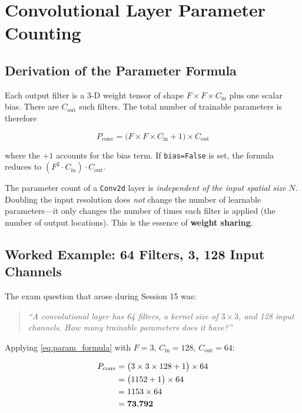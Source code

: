 \documentclass[12pt,a4paper]{article}
\newcommand{\Cin}{C_{\mathrm{in}}}
\newcommand{\Cout}{C_{\mathrm{out}}}
\begin{document}
\section{Convolutional Layer Parameter Counting}
\label{sec:param_count}

\subsection{Derivation of the Parameter Formula}

Each output filter is a 3-D weight tensor of shape $F \times F \times \Cin$
plus one scalar bias. There are $\Cout$ such filters. The total number of
trainable parameters is therefore

\begin{equation}
  \label{eq:param_formula}
  \boxed{P_{\mathrm{conv}} = \bigl(F \times F \times \Cin + 1\bigr) \times \Cout}
\end{equation}

\noindent
where the $+1$ accounts for the bias term. If \texttt{bias=False} is set,
the formula reduces to $(F^2 \cdot \Cin) \cdot \Cout$.

\begin{keyinsight}
The parameter count of a \texttt{Conv2d} layer is \emph{independent of the
input spatial size} $N$. Doubling the input resolution does \emph{not} change
the number of learnable parameters---it only changes the number of times each
filter is applied (the number of output locations). This is the essence of
\textbf{weight sharing}.
\end{keyinsight}

\subsection{Worked Example: 64 Filters, 3, 128 Input Channels}

The exam question that arose during Session 15 was:

\begin{quote}
\itshape
``A convolutional layer has 64 filters, a kernel size of $3 \times 3$, and
128 input channels. How many trainable parameters does it have?''
\end{quote}

Applying \cref{eq:param_formula} with $F = 3$, $\Cin = 128$, $\Cout = 64$:

\begin{align}
  P_{\mathrm{conv}}
    &= \bigl(3 \times 3 \times 128 + 1\bigr) \times 64 \notag \\
    &= \bigl(1152 + 1\bigr) \times 64 \notag \\
    &= 1153 \times 64 \notag \\
    &= \mathbf{73{,}792} \label{eq:example_count}
\end{align}
\end{document}
